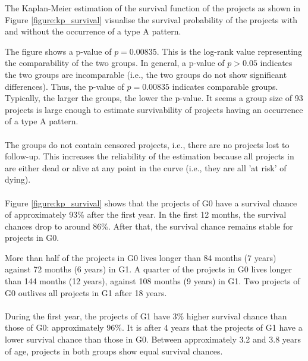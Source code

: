 

\noindent
The Kaplan-Meier estimation of the survival function of the projects as shown
in Figure \ref{figure:kp_survival} visualise the survival probability of
the projects with and without the occurrence of a type A pattern.

The figure shows a p-value of $p = 0.00835$. This is the log-rank value
representing the comparability of the two groups. In general, a p-value of $p >
0.05$ indicates the two groups are incomparable (i.e., the two groups do not
show significant differences). Thus, the p-value of $p = 0.00835$ indicates
comparable groups. Typically, the larger the groups, the lower the p-value.
It seems a group size of 93 projects is large enough to estimate survivability
of projects having an occurrence of a type A pattern.

\paragraph{}
The groups do not contain censored projects, i.e., there are no projects
lost to follow-up. This increases the reliability of the estimation because all
projects in are either dead or alive at any point in the curve (i.e., they are
all 'at risk' of dying).

\paragraph{}
Figure \ref{figure:kp_survival} shows that the projects of G0 have a survival
chance of approximately 93\% after the first year. In the first 12 months, the
survival chances drop to around 86\%. After that, the survival chance remains
stable for projects in G0.

More than half of the projects in G0 lives longer than 84 months (7 years)
against 72 months (6 years) in G1. A quarter of the projects in G0 lives longer
than 144 months (12 years), against 108 months (9 years) in G1. Two projects of
G0 outlives all projects in G1 after 18 years.

\paragraph{}
During the first year, the projects of G1 have 3\% higher survival chance than
those of G0: approximately 96\%. It is after 4 years that the projects of G1
have a lower survival chance than those in G0. Between approximately 3.2 and
3.8 years of age, projects in both groups show equal survival chances.

\begin{comment}
- Factual results
- Tables and figures for clarification

This chapter presents and clarifies the results obtained during the research.
The focus should be on the factual results, not the interpretation or
discussion. Tables and graphics should be used to increase the clarity of the
results where applicable.
Have a look at the the results chapter in this example thesis on Paul’s
homepage\footnote{http://homepages.cwi.nl/~paulk/thesesMasterSoftwareEngineering/2006/ArnoldLankamp.pdf}.
\end{comment}
